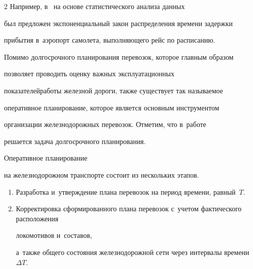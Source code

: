 \begin{multicols}{2}
Например, в~\cite{KibzunNaumovUlanov} на основе статистического анализа данных 


был предложен экспоненциальный закон распределения времени задержки 


прибытия в~аэропорт самолета, выполняющего рейс по расписанию.





Помимо долгосрочного планирования перевозок, которое главным образом 


позволяет проводить оценку важных эксплуатационных


показателей\linebreak ра\-бо\-ты железной дороги, также существует так называемое 


оперативное планирование, которое является основным инструментом 


организации железнодорожных перевозок. Отметим, что в~работе~\cite{AzanovBuyanov} 


решается задача долгосрочного пла\-ни\-ро\-вания. 


{





}





Оперативное планирование 


на железнодорожном транспорте состоит из нескольких этапов. %


\begin{enumerate}[1.]


    \item


    Разработка и~утверждение плана перевозок на период времени, равный~$T$. %


    \item


    Корректировка сформированного плана перевозок с~учетом фактического расположения 


    локомотивов и~составов,


    а~также общего состояния железнодорожной сети через интервалы времени~$\Delta T$.


\end{enumerate}











\end{multicols}

